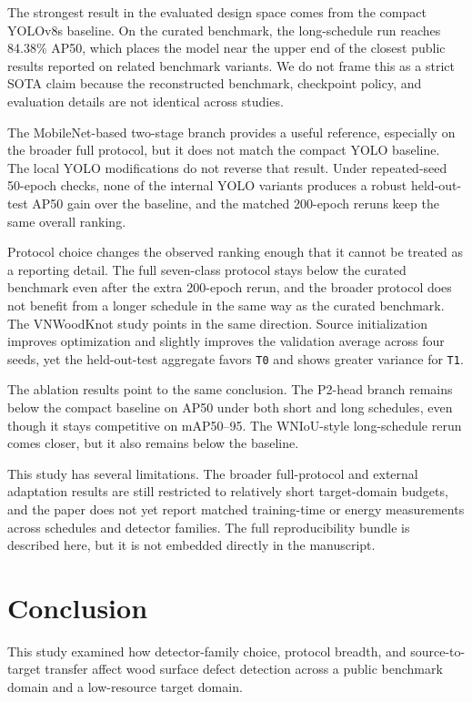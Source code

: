 \documentclass[journal,article,submit,moreauthors,pdftex]{Definitions/tsp}
\begin{document}
The strongest result in the evaluated design space comes from the compact YOLOv8s baseline. On the curated benchmark, the long-schedule run reaches 84.38\% AP50, which places the model near the upper end of the closest public results reported on related benchmark variants. We do not frame this as a strict SOTA claim because the reconstructed benchmark, checkpoint policy, and evaluation details are not identical across studies.

The MobileNet-based two-stage branch provides a useful reference, especially on the broader full protocol, but it does not match the compact YOLO baseline. The local YOLO modifications do not reverse that result. Under repeated-seed 50-epoch checks, none of the internal YOLO variants produces a robust held-out-test AP50 gain over the baseline, and the matched 200-epoch reruns keep the same overall ranking.

Protocol choice changes the observed ranking enough that it cannot be treated as a reporting detail. The full seven-class protocol stays below the curated benchmark even after the extra 200-epoch rerun, and the broader protocol does not benefit from a longer schedule in the same way as the curated benchmark. The VNWoodKnot study points in the same direction. Source initialization improves optimization and slightly improves the validation average across four seeds, yet the held-out-test aggregate favors \texttt{T0} and shows greater variance for \texttt{T1}.

The ablation results point to the same conclusion. The P2-head branch remains below the compact baseline on AP50 under both short and long schedules, even though it stays competitive on mAP50--95. The WNIoU-style long-schedule rerun comes closer, but it also remains below the baseline.

This study has several limitations. The broader full-protocol and external adaptation results are still restricted to relatively short target-domain budgets, and the paper does not yet report matched training-time or energy measurements across schedules and detector families. The full reproducibility bundle is described here, but it is not embedded directly in the manuscript.

\section{Conclusion}
\label{sec:conclusion}

This study examined how detector-family choice, protocol breadth, and source-to-target transfer affect wood surface defect detection across a public benchmark domain and a low-resource target domain.
\end{document}
